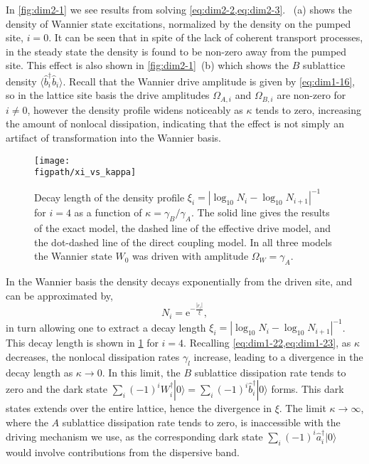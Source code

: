 In \cref{fig:dim2-1} we see results from solving \cref{eq:dim2-2,eq:dim2-3}. ~(a) shows the density of Wannier state excitations, normalized by the density on the pumped site, \(i=0\). It can be seen that in spite of the lack of coherent transport processes, in the steady state the density is found to be non-zero away from the pumped site. This effect is also shown in \cref{fig:dim2-1}~(b) which shows the \(B\) sublattice density \(\langle \hat{b}_{i}^{\dagger}\hat{b}_{i} \rangle\). Recall that the Wannier drive amplitude is given by \cref{eq:dim1-16}, so in the lattice site basis the drive amplitudes \(\Omega_{A,i}\) and \(\Omega_{B,i}\) are non-zero for \(i \neq 0\), however the density profile widens noticeably as \(\kappa\) tends to zero, increasing the amount of nonlocal dissipation, indicating that the effect is not simply an artifact of transformation into the Wannier basis.

\begin{figure}[ht!]
\centering 
\texttt{[image: \\figpath/xi\_vs\_kappa]}
\caption{\label{fig:dim2-2}Decay length of the density profile \(\xi_{i} = |\log_{10}N_{i} - \log_{10}N_{i+1}|^{-1}\) for \(i=4\) as a function of \(\kappa = \gamma_{B}/\gamma_{A}\). The solid line gives the results of the exact model, the dashed line of the effective drive model, and the dot-dashed line of the direct coupling model. In all three models the Wannier state \(W_{0}\) was driven with amplitude \(\Omega_{W} = \gamma_{A}\).}
\end{figure}

In the Wannier basis the density decays exponentially from the driven site, and can be approximated by,
\begin{equation}
	N_{i} = \mathrm{e}^{-\frac{|r_{i}|}{\xi}},
	\label{eq:dim2-4}
\end{equation}
in turn allowing one to extract a decay length \(\xi_{i} = |\log_{10}N_{i} - \log_{10}N_{i+1}|^{-1}\). This decay length is shown in \cref{fig:dim2-2} for \(i=4\). Recalling \cref{eq:dim1-22,eq:dim1-23}, as \(\kappa\) decreases, the nonlocal dissipation rates \(\gamma_{l}\) increase, leading to a divergence in the decay length as \(\kappa \rightarrow 0\). In this limit, the \(B\) sublattice dissipation rate tends to zero and the dark state \(\sum_{i} (-1)^{i}W_{i}^{\dagger}|0\rangle = \sum_{i}(-1)^{i}\hat{b}_{i}^{\dagger}|0\rangle\) forms. This dark states extends over the entire lattice, hence the divergence in \(\xi\). The limit \(\kappa \rightarrow \infty\), where the \(A\) sublattice dissipation rate tends to zero, is inaccessible with the driving mechanism we use, as the corresponding dark state \(\sum_{i}(-1)^{i}\hat{a}_{i}^{\dagger}|0\rangle\) would involve contributions from the dispersive band.  

